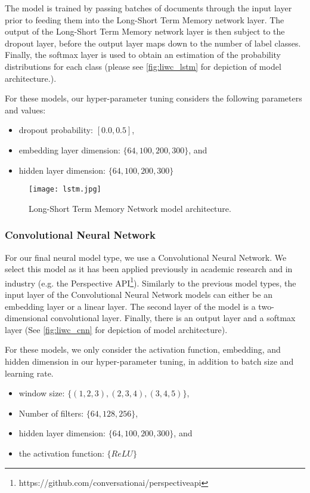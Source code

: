 The model is trained by passing batches of documents through the input layer prior to feeding them into the Long-Short Term Memory network layer. The output of the Long-Short Term Memory network layer is then subject to the dropout layer, before the output layer maps down to the number of label classes. Finally, the softmax layer is used to obtain an estimation of the probability distributions for each class (please see \autoref{fig:liwc_lstm} for depiction of model architecture.).

For these models, our hyper-parameter tuning considers the following parameters and values:

\begin{itemize}
  \item dropout probability: $[0.0, 0.5]$,
  \item embedding layer dimension: $\{64, 100, 200, 300\}$, and
  \item hidden layer dimension: $\{64, 100, 200, 300\}$
\end{itemize}

\begin{figure}
  \centering
  \texttt{[image: lstm.jpg]}
  \caption{Long-Short Term Memory Network model architecture.}
  \label{fig:liwc_lstm}
\end{figure}

\subsubsection{Convolutional Neural Network}

For our final neural model type, we use a Convolutional Neural Network. We select this model as it has been applied previously in academic research \cite{CITE: CNN papers} and in industry (e.g. the Perspective API\footnote{https://github.com/conversationai/perspectiveapi}). Similarly to the previous model types, the input layer of the Convolutional Neural Network models can either be an embedding layer or a linear layer. The second layer of the model is a two-dimensional convolutional layer. Finally, there is an output layer and a softmax layer (See \autoref{fig:liwc_cnn} for depiction of model architecture).

For these models, we only consider the activation function, embedding, and hidden dimension in our hyper-parameter tuning, in addition to batch size and learning rate.

\begin{itemize}
  \item window size: $\{(1, 2, 3), (2, 3, 4), (3, 4, 5)\}$,
  \item Number of filters: $\{64, 128, 256\}$,
  \item hidden layer dimension: $\{64, 100, 200, 300\}$, and
  \item the activation function: $\{ReLU\}$
\end{itemize}

